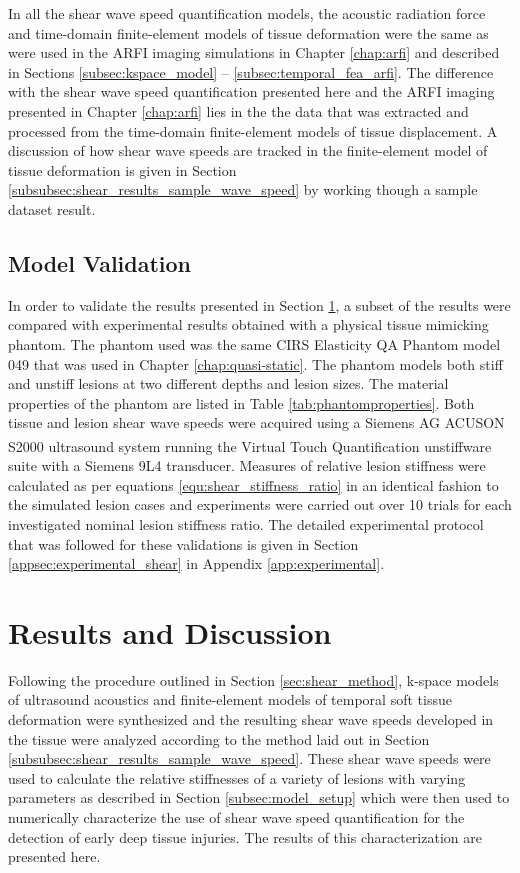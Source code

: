 			In all the shear wave speed quantification models, the acoustic radiation force and time-domain finite-element models of tissue deformation were the same as were used in the ARFI imaging simulations in Chapter \ref{chap:arfi} and described in Sections \ref{subsec:kspace_model} -- \ref{subsec:temporal_fea_arfi}. The difference with the shear wave speed quantification presented here and the ARFI imaging presented in Chapter \ref{chap:arfi} lies in the the data that was extracted and processed from the time-domain finite-element models of tissue displacement. A discussion of how shear wave speeds are tracked in the finite-element model of tissue deformation is given in Section \ref{subsubsec:shear_results_sample_wave_speed} by working though a sample dataset result.

		\subsection{Model Validation}
		\label{subsec:shear_model_validation}
			In order to validate the results presented in Section \ref{subsec:shear_results}, a subset of the results were compared with experimental results obtained with a physical tissue mimicking phantom. The phantom used was the same CIRS Elasticity QA Phantom model 049 that was used in Chapter \ref{chap:quasi-static}. The phantom models both stiff and unstiff lesions at two different depths and lesion sizes. The material properties of the phantom are listed in Table \ref{tab:phantomproperties}. Both tissue and lesion shear wave speeds were acquired using a Siemens AG ACUSON S2000\textsuperscript{\texttrademark} ultrasound system running the Virtual Touch\textsuperscript{\texttrademark} Quantification unstiffware suite with a Siemens 9L4 transducer. Measures of relative lesion stiffness were calculated as per equations \ref{equ:shear_stiffness_ratio} in an identical fashion to the simulated lesion cases and experiments were carried out over 10 trials for each investigated nominal lesion stiffness ratio. The detailed experimental protocol that was followed for these validations is given in Section \ref{appsec:experimental_shear} in Appendix \ref{app:experimental}.

	\section{Results and Discussion}
	\label{subsec:shear_results}
		Following the procedure outlined in Section \ref{sec:shear_method}, k-space models of ultrasound acoustics and finite-element models of temporal soft tissue deformation were synthesized and the resulting shear wave speeds developed in the tissue were analyzed according to the method laid out in Section \ref{subsubsec:shear_results_sample_wave_speed}. These shear wave speeds were used to calculate the relative stiffnesses of a variety of lesions with varying parameters as described in Section \ref{subsec:model_setup} which were then used to numerically characterize the use of shear wave speed quantification for the detection of early deep tissue injuries. The results of this characterization are presented here.

